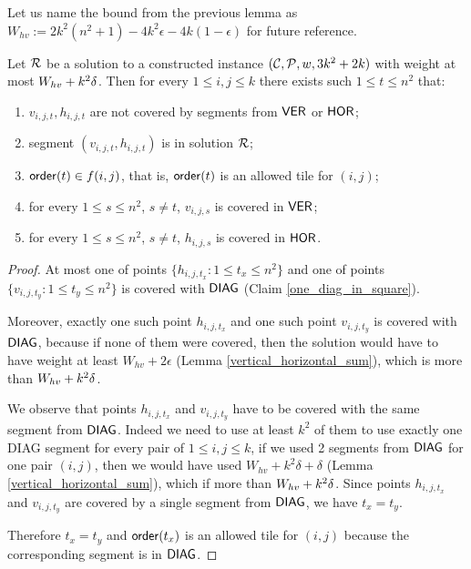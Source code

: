 Let us name the bound from the previous lemma
as $W_{hv} := 2k^2(n^2+1) -4k^2\epsilon -4k(1-\epsilon)$
for future reference.

\begin{lemma}
\label{diag_correct}
Let $\mathcal{R}$ be a solution to a constructed instance $(\mathcal{C}, \mathcal{P}, w, 3k^2+2k)$
with weight at most  $W_{hv} +k^2\delta$.
Then for every $1 \le i,j \le k$
there exists such $1 \le t \le n^2$ that:
\begin{enumerate}[label={(\arabic*)}]
\item $v_{i,j,t}, h_{i,j,t}$ are not covered by segments from $\mathsf{VER}$ or $\mathsf{HOR}$;
\item segment $(v_{i,j,t}, h_{i,j,t})$ is in solution $\mathcal{R}$;
\item $\mathsf{order}(t) \in f(i,j)$, that is, $\mathsf{order}(t)$ is an allowed tile for $(i,j)$;
\item for every $1 \le s\le n^2$, $s \neq t$, $v_{i,j,s}$ is covered in $\mathsf{VER}$;
\item for every $1 \le s\le n^2$, $s \neq t$, $h_{i,j,s}$ is covered in $\mathsf{HOR}$.
\end{enumerate}
\end{lemma}

\begin{proof}
At most one of points $\{h_{i,j,t_x} : 1 \le t_x \le n^2\}$
and one of points $\{v_{i,j,t_y} : 1 \le t_y \le n^2\}$
is covered with $\mathsf{DIAG}$
(Claim \ref{one_diag_in_square}).
	
Moreover, exactly one such point $h_{i,j,t_x}$ and one such point $v_{i,j,t_y}$
is covered with $\mathsf{DIAG}$,
because if none of them were covered, then the solution would have to
have weight at least $W_{hv} + 2\epsilon$ (Lemma \ref{vertical_horizontal_sum}),
which is more than $W_{hv} +k^2\delta$.

We observe that points $h_{i,j,t_x}$ and $v_{i,j,t_y}$
have to be covered with the same segment from $\mathsf{DIAG}$.
Indeed we need to use at least $k^2$ of them to use
exactly one DIAG segment for every pair of $1 \le i,j \le k$,
if we used 2 segments from $\mathsf{DIAG}$
for one pair $(i,j)$,
then we would have used $W_{hv} + k^2\delta + \delta$ (Lemma \ref{vertical_horizontal_sum}),
which if more than $W_{hv} +k^2\delta$.
Since points $h_{i,j,t_x}$ and $v_{i,j,t_y}$ are covered by
a single segment from $\mathsf{DIAG}$, we have $t_x = t_y$.

Therefore $t_x = t_y$
and $\mathsf{order}(t_x)$ is an allowed tile for $(i,j)$
because the corresponding segment is in $\mathsf{DIAG}$.
\end{proof}

